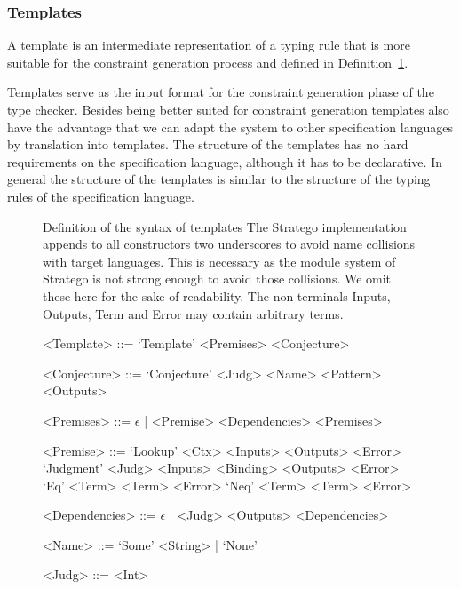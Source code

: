 \subsubsection{Templates}
A template is an intermediate representation of a typing rule that is
more suitable for the constraint generation process and defined in
Definition~\ref{def:template}.

Templates serve as the input format for the constraint generation
phase of the type checker. Besides being better suited for constraint
generation templates also have the advantage that we can adapt the
system to other specification languages by translation into
templates. The structure of the templates has no hard requirements on
the specification language, although it has to be declarative. In
general the structure of the templates is similar to the structure of
the typing rules of the specification language.

\begin{figure}
\begin{definition}{Definition of the syntax of templates}
   The Stratego implementation appends to all
  constructors two underscores to avoid name collisions with target
  languages. This is necessary as the module system of Stratego is not
  strong enough to avoid those collisions. We omit these here for the
  sake of readability. The non-terminals Inputs, Outputs, Term and
  Error may contain arbitrary terms.
  \begin{grammar}
    <Template> ::= `Template' <Premises> <Conjecture>

    <Conjecture> ::= `Conjecture' <Judg> <Name> <Pattern> <Outputs>

    <Premises> ::= $\epsilon$ | <Premise> <Dependencies> <Premises>

    <Premise> ::= `Lookup' <Ctx> <Inputs> <Outputs> <Error>
    \alt `Judgment' <Judg> <Inputs> <Binding> <Outputs> <Error>
    \alt `Eq' <Term> <Term> <Error>
    \alt `Neq' <Term> <Term> <Error>

    <Dependencies> ::= $\epsilon$ | <Judg> <Outputs> <Dependencies>

    <Name> ::= `Some' <String> | `None'

    <Judg> ::= <Int>
  \end{grammar}
\label{def:template}
\end{definition}
\end{figure}


